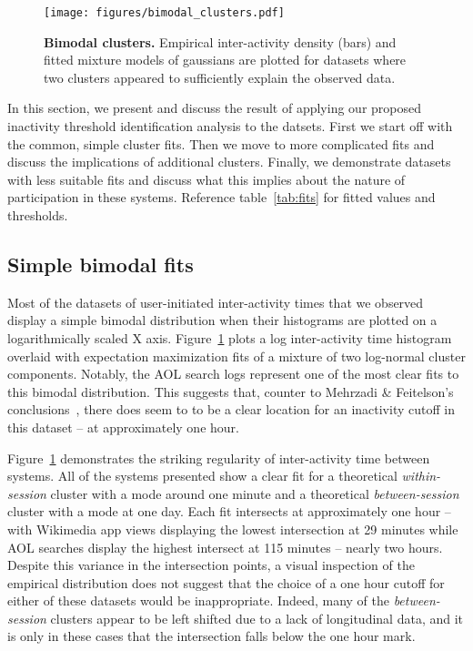 \begin{figure}
\centering
\texttt{[image: figures/bimodal\_clusters.pdf]}
\caption{
    \textbf{Bimodal clusters.} Empirical inter-activity density (bars) and fitted mixture models of gaussians are plotted for datasets where two clusters appeared to sufficiently explain the observed data.
}
\label{fig:bimodal_clusters}
\end{figure}

In this section, we present and discuss the result of applying our proposed inactivity threshold identification analysis to the datsets.  First we start off with the common, simple cluster fits.  Then we move to more complicated fits and discuss the implications of additional clusters.  Finally, we demonstrate datasets with less suitable fits and discuss what this implies about the nature of participation in these systems.  Reference table~\ref{tab:fits} for fitted values and thresholds.

\subsection{Simple bimodal fits}
Most of the datasets of user-initiated inter-activity times that we observed display a simple bimodal distribution when their histograms are plotted on a logarithmically scaled X axis.  Figure~\ref{fig:bimodal_clusters} plots a log inter-activity time histogram overlaid with expectation maximization fits of a mixture of two log-normal cluster components.  Notably, the AOL search logs represent one of the most clear fits to this bimodal distribution.  This suggests that, counter to Mehrzadi \& Feitelson's conclusions~\cite{mehrzadi2012onextracting}, there does seem to to be a clear location for an inactivity cutoff in this dataset -- at approximately one hour.

Figure~\ref{fig:bimodal_clusters} demonstrates the striking regularity of inter-activity time between systems.  All of the systems presented show a clear fit for a theoretical \emph{within-session} cluster with a mode around one minute and a theoretical \emph{between-session} cluster with a mode at one day.  Each fit intersects at approximately one hour -- with Wikimedia app views displaying the lowest intersection at 29 minutes while AOL searches display the highest intersect at 115 minutes -- nearly two hours.   Despite this variance in the intersection points, a visual inspection of the empirical distribution does not suggest that the choice of a one hour cutoff for either of these datasets would be inappropriate.  Indeed, many of the \emph{between-session} clusters appear to be left shifted due to a lack of longitudinal data, and it is only in these cases that the intersection falls below the one hour mark.

